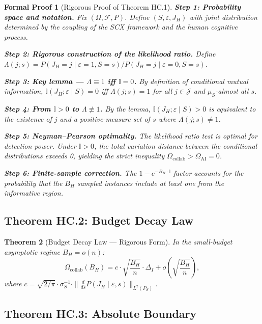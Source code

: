 \documentclass[12pt,a4paper]{article}
\newtheorem{theorem}{Theorem}[section]
\newtheorem{formalproof}[theorem]{Formal Proof}
\newcommand{\I}{\mathbb{I}}
\newcommand{\cF}{\mathcal{F}}
\newcommand{\cJ}{\mathcal{J}}
\begin{document}
\begin{formalproof}[Rigorous Proof of Theorem HC.1]
\textbf{Step 1: Probability space and notation.} Fix $(\Omega, \cF, P)$. Define $(S, \varepsilon, J_H)$ with joint distribution determined by the coupling of the SCX framework and the human cognitive process.

\textbf{Step 2: Rigorous construction of the likelihood ratio.} Define $\Lambda(j; s) = P(J_H=j \mid \varepsilon=1, S=s) / P(J_H=j \mid \varepsilon=0, S=s)$.

\textbf{Step 3: Key lemma --- $\Lambda \equiv 1$ iff $\I = 0$.} By definition of conditional mutual information, $\I(J_H; \varepsilon \mid S) = 0$ iff $\Lambda(j;s) = 1$ for all $j \in \cJ$ and $\mu_S$-almost all $s$.

\textbf{Step 4: From $\I > 0$ to $\Lambda \not\equiv 1$.} By the lemma, $\I(J_H; \varepsilon \mid S) > 0$ is equivalent to the existence of $j$ and a positive-measure set of $s$ where $\Lambda(j;s) \neq 1$.

\textbf{Step 5: Neyman--Pearson optimality.} The likelihood ratio test is optimal for detection power. Under $\I > 0$, the total variation distance between the conditional distributions exceeds 0, yielding the strict inequality $\Omega_{\mathrm{collab}} > \Omega_{\mathrm{AI}} = 0$.

\textbf{Step 6: Finite-sample correction.} The $1 - e^{-B_H \cdot \I}$ factor accounts for the probability that the $B_H$ sampled instances include at least one from the informative region.
\end{formalproof}

\subsection{Theorem HC.2: Budget Decay Law}

\begin{theorem}[Budget Decay Law --- Rigorous Form]
\label{thm:budget-decay}
In the small-budget asymptotic regime $B_H = o(n)$:
\begin{equation}\label{eq:budget-decay-formal}
    \Omega_{\mathrm{collab}}(B_H) =
    c \cdot \sqrt{\frac{B_H}{n}} \cdot \Delta_I
    + o\!\left(\sqrt{\frac{B_H}{n}}\right),
\end{equation}
where $c = \sqrt{2/\pi} \cdot \sigma_S^{-1} \cdot \| \frac{d}{ds} P(J_H \mid \varepsilon, s) \|_{L^2(P_S)}$.
\end{theorem}

\subsection{Theorem HC.3: Absolute Boundary}
\end{document}
